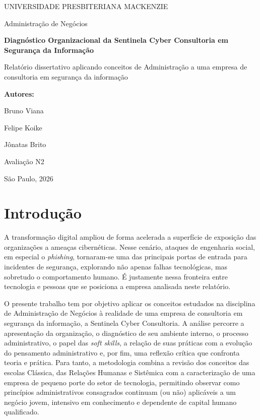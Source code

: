 \documentclass[12pt,a4paper]{article}
\begin{document}
\begin{titlepage}
  \centering
  {\large UNIVERSIDADE PRESBITERIANA MACKENZIE\par}
  \vspace{0.5cm}
  {\normalsize Administração de Negócios\par}
  \vfill
  {\Large\bfseries Diagnóstico Organizacional da Sentinela Cyber Consultoria em Segurança da Informação\par}
  \vspace{0.4cm}
  {\large Relatório dissertativo aplicando conceitos de Administração a uma empresa de consultoria em segurança da informação\par}
  \vfill
  {\normalsize\bfseries Autores:\par}
  {\normalsize Bruno Viana\par}
  {\normalsize Felipe Koike\par}
  {\normalsize Jônatas Brito\par}
  \vfill
  {\normalsize Avaliação N2\par}
  {\normalsize São Paulo, 2026\par}
\end{titlepage}

\section{Introdução}

A transformação digital ampliou de forma acelerada a superfície de exposição
das organizações a ameaças cibernéticas. Nesse cenário, ataques de engenharia
social, em especial o \textit{phishing}, tornaram-se uma das principais portas
de entrada para incidentes de segurança, explorando não apenas falhas
tecnológicas, mas sobretudo o comportamento humano. É justamente nessa
fronteira entre tecnologia e pessoas que se posiciona a empresa analisada neste
relatório.

O presente trabalho tem por objetivo aplicar os conceitos estudados na
disciplina de Administração de Negócios à realidade de uma empresa de
consultoria em segurança da informação, a Sentinela Cyber Consultoria. A
análise percorre a apresentação da organização, o diagnóstico de seu ambiente
interno, o processo administrativo, o papel das \textit{soft skills}, a relação
de suas práticas com a evolução do pensamento administrativo e, por fim, uma
reflexão crítica que confronta teoria e prática. Para tanto, a metodologia
combina a revisão dos conceitos das escolas Clássica, das Relações Humanas e
Sistêmica com a caracterização de uma empresa de pequeno porte do setor de
tecnologia, permitindo observar como princípios administrativos consagrados
continuam (ou não) aplicáveis a um negócio jovem, intensivo em conhecimento e
dependente de capital humano qualificado.
\end{document}
